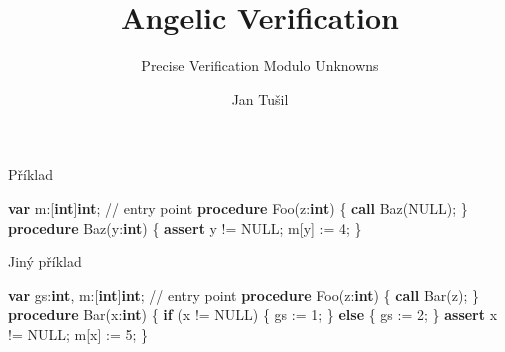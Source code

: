 \documentclass[11pt]{beamer}
\author{Jan Tušil}
\title{Angelic Verification}
\subtitle{Precise Verification Modulo Unknowns}
\begin{document}
\begin{frame}
\titlepage
\end{frame}



\begin{frame}[fragile]{Příklad}
\begin{semiverbatim}
\textbf{var} m:[\textbf{int}]\textbf{int};
\pause
// entry point
\textbf{procedure} Foo(z:\textbf{int}) \{
  \textbf{call} Baz(NULL);
\}
\pause
\textbf{procedure} Baz(y:\textbf{int}) \{
  \textbf{assert} y != NULL; 
  m[y] := 4;
\}
\end{semiverbatim}
\end{frame}


\begin{frame}[fragile]{Jiný příklad}
\begin{semiverbatim}
\textbf{var} gs:\textbf{int}, m:[\textbf{int}]\textbf{int};
\pause{}
// entry point
\textbf{procedure} Foo(z:\textbf{int}) \{
  \textbf{call} Bar(z);
\}\pause
{}
\textbf{procedure} Bar(x:\textbf{int}) \{
  \textbf{if} (x != NULL) \{ gs := 1; \}
  \textbf{else} \{ gs := 2; \}
  \textbf{assert} x != NULL; 
  m[x] := 5;
\}
\end{semiverbatim}
\end{frame}
\end{document}
